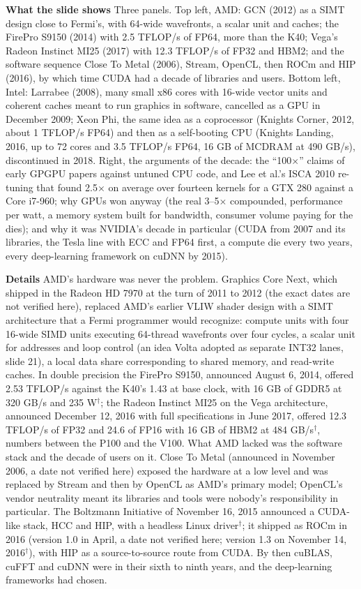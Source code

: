 \documentclass[11pt,letterpaper]{article}
\newcommand{\para}[1]{\medskip\noindent\textbf{#1}\quad}
\begin{document}
\para{What the slide shows} Three panels. Top left, AMD: GCN (2012) as a SIMT design close to Fermi's, with 64-wide wavefronts, a scalar unit and caches; the FirePro S9150 (2014) with 2.5 TFLOP/s of FP64, more than the K40; Vega's Radeon Instinct MI25 (2017) with 12.3 TFLOP/s of FP32 and HBM2; and the software sequence Close To Metal (2006), Stream, OpenCL, then ROCm and HIP (2016), by which time CUDA had a decade of libraries and users. Bottom left, Intel: Larrabee (2008), many small x86 cores with 16-wide vector units and coherent caches meant to run graphics in software, cancelled as a GPU in December 2009; Xeon Phi, the same idea as a coprocessor (Knights Corner, 2012, about 1 TFLOP/s FP64) and then as a self-booting CPU (Knights Landing, 2016, up to 72 cores and 3.5 TFLOP/s FP64, 16 GB of MCDRAM at 490 GB/s), discontinued in 2018. Right, the arguments of the decade: the ``100$\times$'' claims of early GPGPU papers against untuned CPU code, and Lee et al.'s ISCA 2010 re-tuning that found 2.5$\times$ on average over fourteen kernels for a GTX 280 against a Core i7-960; why GPUs won anyway (the real 3--5$\times$ compounded, performance per watt, a memory system built for bandwidth, consumer volume paying for the dies); and why it was NVIDIA's decade in particular (CUDA from 2007 and its libraries, the Tesla line with ECC and FP64 first, a compute die every two years, every deep-learning framework on cuDNN by 2015).

\para{Details} AMD's hardware was never the problem. Graphics Core Next, which shipped in the Radeon HD 7970 at the turn of 2011 to 2012 (the exact dates are not verified here), replaced AMD's earlier VLIW shader design with a SIMT architecture that a Fermi programmer would recognize: compute units with four 16-wide SIMD units executing 64-thread wavefronts over four cycles, a scalar unit for addresses and loop control (an idea Volta adopted as separate INT32 lanes, slide 21), a local data share corresponding to shared memory, and read-write caches. In double precision the FirePro S9150, announced August 6, 2014, offered 2.53 TFLOP/s against the K40's 1.43 at base clock, with 16 GB of GDDR5 at 320 GB/s and 235 W$^\dagger$; the Radeon Instinct MI25 on the Vega architecture, announced December 12, 2016 with full specifications in June 2017, offered 12.3 TFLOP/s of FP32 and 24.6 of FP16 with 16 GB of HBM2 at 484 GB/s$^\dagger$, numbers between the P100 and the V100. What AMD lacked was the software stack and the decade of users on it. Close To Metal (announced in November 2006, a date not verified here) exposed the hardware at a low level and was replaced by Stream and then by OpenCL as AMD's primary model; OpenCL's vendor neutrality meant its libraries and tools were nobody's responsibility in particular. The Boltzmann Initiative of November 16, 2015 announced a CUDA-like stack, HCC and HIP, with a headless Linux driver$^\dagger$; it shipped as ROCm in 2016 (version 1.0 in April, a date not verified here; version 1.3 on November 14, 2016$^\dagger$), with HIP as a source-to-source route from CUDA. By then cuBLAS, cuFFT and cuDNN were in their sixth to ninth years, and the deep-learning frameworks had chosen.
\end{document}
